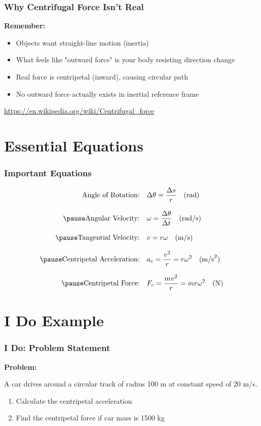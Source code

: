 \documentclass{beamer}
\begin{document}
\begin{frame}
\frametitle{Why Centrifugal Force Isn't Real}
\textbf{Remember:}
\pause
\begin{itemize}
    \item Objects want straight-line motion (inertia)
    \pause
    \item What feels like "outward force" is your body resisting direction change
    \pause
    \item Real force is centripetal (inward), causing circular path
    \pause
    \item No outward force actually exists in inertial reference frame
\end{itemize}
\pause

\vspace{0.5cm}
\small{\url{https://en.wikipedia.org/wiki/Centrifugal_force}}
\end{frame}

\section{Essential Equations}

\begin{frame}
\frametitle{Important Equations}
\pause
\begin{align*}
\text{Angle of Rotation:} & \quad \Delta \theta = \frac{\Delta s}{r} \quad \text{(rad)} \\[0.8em]
\pause
\text{Angular Velocity:} & \quad \omega = \frac{\Delta \theta}{\Delta t} \quad \text{(rad/s)} \\[0.8em]
\pause
\text{Tangential Velocity:} & \quad v = r\omega \quad \text{(m/s)} \\[0.8em]
\pause
\text{Centripetal Acceleration:} & \quad a_c = \frac{v^2}{r} = r\omega^2 \quad \text{(m/s}^2\text{)} \\[0.8em]
\pause
\text{Centripetal Force:} & \quad F_c = \frac{mv^2}{r} = mr\omega^2 \quad \text{(N)}
\end{align*}
\end{frame}

\section{I Do Example}

\begin{frame}
\frametitle{I Do: Problem Statement}
\textbf{Problem:}

A car drives around a circular track of radius 100 m at constant speed of 20 m/s.
\begin{enumerate}
    \item Calculate the centripetal acceleration
    \item Find the centripetal force if car mass is 1500 kg
\end{enumerate}
\end{frame}
\end{document}
